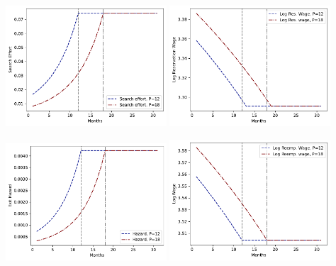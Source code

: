 \documentclass[letter, 10pt]{article}
\begin{document}
\includegraphics[clip=true,trim=0cm 0cm 0cm 0cm,width = 0.45\textwidth]{figures_Est1_compiled/fig_type3_s.pdf} 
\includegraphics[clip=true,trim=0cm 0cm 0cm 0cm,width = 0.45\textwidth]{figures_Est1_compiled/fig_type3_phi.pdf} 

\includegraphics[clip=true,trim=0cm 0cm 0cm 0cm,width = 0.45\textwidth]{figures_Est1_compiled/fig_type3_hazard.pdf} 
\includegraphics[clip=true,trim=0cm 0cm 0cm 0cm,width = 0.45\textwidth]{figures_Est1_compiled/fig_type3_w.pdf} 
\end{document}
